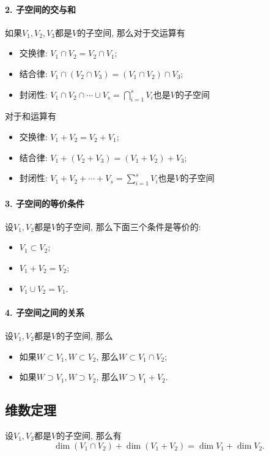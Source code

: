 \documentclass{ctexart}
\begin{document}
\paragraph{2. 子空间的交与和} 如果$V_1, V_2, V_3$都是$V$的子空间, 那么对于交运算有
\begin{itemize}
    \item 交换律: $V_1\cap V_2 = V_2 \cap V_1$;
    \item 结合律: $V_1 \cap (V_2 \cap V_3)=(V_1\cap V_2)\cap V_3$;
    \item 封闭性: $V_1\cap V_2\cap \cdots \cup V_s =\bigcap_{i=1}^s V_i$也是$V$的子空间
\end{itemize}
对于和运算有
\begin{itemize}
    \item 交换律: $V_1+V_2=V_2+V_1$;
    \item 结合律: $V_1 + (V_2 + V_3)=(V_1 + V_2)+ V_3$;
    \item 封闭性: $V_1+V_2+ \cdots + V_s =\sum_{i=1}^s V_i$也是$V$的子空间
\end{itemize}

\paragraph{3. 子空间的等价条件} 设$V_1, V_2$都是$V$的子空间, 那么下面三个条件是等价的:
\begin{itemize}
    \item $V_1\subset V_2$;
    \item $V_1+V_2=V_2$;
    \item $V_1\cup V_2=V_1$.
\end{itemize}

\paragraph{4. 子空间之间的关系} 设$V_1, V_2$都是$V$的子空间, 那么
\begin{itemize}
    \item 如果$W\subset V_1, W\subset V_2$, 那么$W \subset V_1 \cap V_2$;
    \item 如果$W\supset V_1,W\supset V_2$, 那么$W\supset V_1+V_2$. 
\end{itemize}

\subsection{维数定理}

\begin{theorem}
    设$V_1,V_2$都是$V$的子空间, 那么有
    \[
    \dim(V_{1}\cap V_{2})+\dim(V_{1}+V_{2})=\dim V_{1}+\dim V_{2}.
    \]
\end{theorem}
\end{document}
